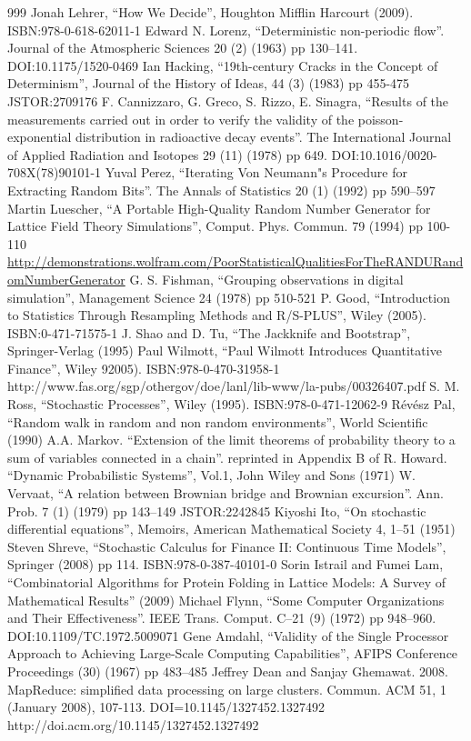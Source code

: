 \documentclass[justified, sixbynine]{tufte-book}
\theoremstyle{plain}%
\newtheorem * {corollary}{Corollary}
\theoremstyle{definition}
\theoremstyle{remark}
\newtheorem * {remark}{Remark}
\newtheorem * {note}{Note}
\begin{document}
\begin{thebibliography}{999}
 Jonah Lehrer, ``How We Decide'', Houghton Mifflin Harcourt (2009). ISBN:978-0-618-62011-1
 Edward N. Lorenz, ``Deterministic non-periodic flow''. Journal of the Atmospheric Sciences 20 (2) (1963) pp 130–141. DOI:10.1175/1520-0469
 Ian Hacking, ``19th-century Cracks in the Concept of Determinism'', Journal of the History of Ideas, 44 (3) (1983) pp 455-475 JSTOR:2709176
 F. Cannizzaro, G. Greco, S. Rizzo, E. Sinagra, ``Results of the measurements carried out in order to verify the validity of the poisson-exponential distribution in radioactive decay events''. The International Journal of Applied Radiation and Isotopes 29 (11) (1978) pp 649. DOI:10.1016/0020-708X(78)90101-1
 Yuval Perez, ``Iterating Von Neumann"s Procedure for Extracting Random Bits''. The Annals of Statistics 20 (1) (1992) pp 590–597
 Martin Luescher, ``A Portable High-Quality Random Number Generator for Lattice Field Theory Simulations'', Comput. Phys. Commun. 79 (1994) pp 100-110
 \url{http://demonstrations.wolfram.com/PoorStatisticalQualitiesForTheRANDURandomNumberGenerator}
 G. S. Fishman, ``Grouping observations in digital simulation'', Management Science 24 (1978) pp 510-521
 P. Good, ``Introduction to Statistics Through Resampling Methods and R/S-PLUS'', Wiley (2005). ISBN:0-471-71575-1
 J. Shao and D. Tu, ``The Jackknife and Bootstrap'', Springer-Verlag (1995)
 Paul Wilmott, ``Paul Wilmott Introduces Quantitative Finance'', Wiley 92005). ISBN:978-0-470-31958-1
 http://www.fas.org/sgp/othergov/doe/lanl/lib-www/la-pubs/00326407.pdf
 S. M. Ross, ``Stochastic Processes'', Wiley (1995). ISBN:978-0-471-12062-9
 Révész Pal, ``Random walk in random and non random environments'', World Scientific (1990)
 A.A. Markov. ``Extension of the limit theorems of probability theory to a sum of variables connected in a chain''. reprinted in Appendix B of R. Howard. ``Dynamic Probabilistic Systems'', Vol.1, John Wiley and Sons (1971)
 W. Vervaat, ``A relation between Brownian bridge and Brownian excursion''. Ann. Prob. 7 (1) (1979) pp 143–149 JSTOR:2242845
 Kiyoshi Ito, ``On stochastic differential equations'', Memoirs, American Mathematical Society 4, 1–51 (1951)
 Steven Shreve, ``Stochastic Calculus for Finance II: Continuous Time Models'', Springer (2008) pp 114. ISBN:978-0-387-40101-0
 Sorin Istrail and Fumei Lam, ``Combinatorial Algorithms for Protein Folding in Lattice Models: A Survey of Mathematical Results'' (2009)
 Michael Flynn, ``Some Computer Organizations and Their Effectiveness''. IEEE Trans. Comput. C–21 (9) (1972) pp 948–960. DOI:10.1109/TC.1972.5009071
 Gene Amdahl, ``Validity of the Single Processor Approach to Achieving Large-Scale Computing Capabilities'', AFIPS Conference Proceedings (30) (1967) pp 483–485
 Jeffrey Dean and Sanjay Ghemawat. 2008. MapReduce: simplified data processing on large clusters. Commun. ACM 51, 1 (January 2008), 107-113. DOI=10.1145/1327452.1327492 http://doi.acm.org/10.1145/1327452.1327492
\end{thebibliography}
\end{document}
